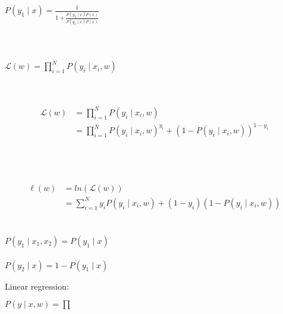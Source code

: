 \documentclass[10pt,a4paper]{article}
\begin{document}
$P(y_1\mid x) = \frac{1}{1 + \frac{P(y_2\mid x)P(x)}{P(y_1\mid x)P(x)}}$
~\\\\
~\\\\

$\mathcal{L}(w) = \prod_{i=1}^N P(y_i \mid x_i, w)$
~\\\
~\\\

\begin{equation} \label{eq1}
\begin{split}
\mathcal{L}(w) & = \prod_{i=1}^N P(y_i \mid x_i, w) \\
 & = \prod_{i=1}^N P(y_i \mid x_i, w)^{y_i} + (1 - P(y_i \mid x_i, w))^{1 - y_i}
\end{split}
\end{equation}
~\\\
~\\\

\begin{equation} \label{eq1}
\begin{split}
\ell(w) & = ln(\mathcal{L}(w)) \\
 & = \sum_{i=1}^N y_i P(y_i \mid x_i, w) + (1 - y_i) (1 - P(y_i \mid x_i, w))
\end{split}
\end{equation}
~\\\\
$P(y_1 \mid x_1, x_2) = P(y_1 \mid x)$
~\\\\
$P(y_2 \mid x) = 1 - P(y_1 \mid x)$

\newpage

Linear regression:

$P(y \mid x, w) = \prod$
\end{document}
